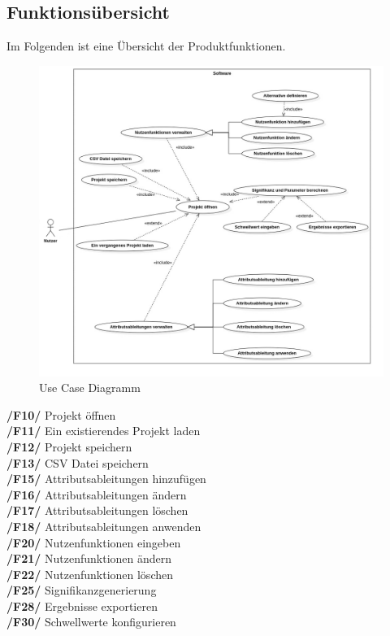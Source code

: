 \documentclass{article}
\begin{document}
\subsection{Funktionsübersicht}
Im Folgenden ist eine Übersicht der Produktfunktionen.
\begin{figure}[H]%
  \centering
  \includegraphics[width=15cm]{use case5.jpg}
  \caption{Use Case Diagramm}
\end{figure} 
\newpage
\textbf{/F10/} Projekt öffnen \\
\textbf{/F11/} Ein existierendes Projekt laden \\
\textbf{/F12/} Projekt speichern \\
\textbf{/F13/} CSV Datei speichern \\
\textbf{/F15/} Attributsableitungen hinzufügen \\
\textbf{/F16/} Attributsableitungen ändern \\
\textbf{/F17/} Attributsableitungen löschen \\
\textbf{/F18/} Attributsableitungen anwenden \\
\textbf{/F20/} Nutzenfunktionen eingeben \\
\textbf{/F21/} Nutzenfunktionen ändern \\
\textbf {/F22/} Nutzenfunktionen löschen \\
\textbf{/F25/} Signifikanzgenerierung \\
\textbf{/F28/} Ergebnisse exportieren \\
\textbf{/F30/} Schwellwerte konfigurieren
\\[0.5in]
\end{document}
